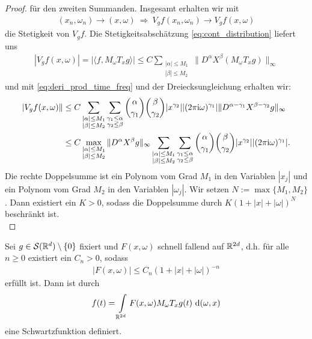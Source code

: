 \begin{proof}
	für den zweiten Summanden.
	Insgesamt erhalten wir mit
	\begin{align*}
	(x_n,\omega_n) \to (x,\omega) \ 
	\Rightarrow 
	\
	V_g f(x_n, \omega_n) \to V_g f (x, \omega)
	\end{align*}
	die Stetigkeit von $ V_g f $.
	Die Stetigkeitsabschätzung \eqref{eq:cont_distribution} liefert uns
	\begin{align*}
	| V_g f(x,\omega) |
	=
	|\langle f, M_\omega T_x g \rangle |
	\leq
	C
	\sum \limits_{\substack{|\alpha| \leq M_1\\
		|\beta| \leq M_2}
		}
	\| D^\alpha X^\beta (M_\omega T_x g)\|_\infty
	\end{align*}
	und mit \eqref{eq:deri_prod_time_freq} und der Dreiecksungleichung erhalten wir:
	\begin{align*}
	|V_g f(x,\omega)\| 
	&\leq 
	C
	\sum \limits_{
		\substack{|\alpha| \leq M_1 \\ |\beta| \leq M_2}
		}
	\sum \limits_{
		\substack{\gamma_1 \leq \alpha\\ \gamma_2 \leq \beta}
		}
	\binom{\alpha}{\gamma_1} \binom{\beta}{\gamma_2}
	|x^{\gamma_2}| |(2\pi \textrm{i} \omega)^{\gamma_1} | 
	\| D^{\alpha-\gamma_1} X^{\beta - \gamma_2} g \|_\infty\\
	&\leq
	C
	\max \limits_{
		\substack{|\alpha| \leq M_1 \\ |\beta| \leq M_2}
		}
	\| D^\alpha X^\beta g \|_\infty
	\sum \limits_{
		\substack{|\alpha| \leq M_1 \\ |\beta| \leq M_2}
	}
	\sum \limits_{
		\substack{\gamma_1 \leq \alpha\\ \gamma_2 \leq \beta}
	}
	\binom{\alpha}{\gamma_1} \binom{\beta}{\gamma_2}
	|x^{\gamma_2}| |(2\pi \textrm{i} \omega)^{\gamma_1} |.
	\end{align*}
	Die rechte Doppelsumme ist ein Polynom vom Grad $ M_1 $ in den Variablen $ |x_j| $ und ein Polynom vom Grad $ M_2 $ in den Variablen $ |\omega_j| $.
	Wir setzen $ N := \max\{M_1,M_2\} $. Dann existiert ein $ K > 0 $, sodass
	die Doppelsumme durch $ K (1+ |x| + |\omega|)^N $ beschränkt ist.\\
	\qedhere
\end{proof}
\vspace{-2.9cm}
\begin{lem}\label{th:rapid_decay_implies_schwartz}
Sei $ g \in \mathcal{S}(\mathbb{R}^d) \setminus \{ 0\} $ fixiert und $ F(x, \omega) $ schnell fallend auf $ \mathbb{R}^{2d} $, d.h. für alle $ n \geq 0 $ existiert ein $ C_n > 0 $, sodass 
\begin{align}\label{eq:rapid_decay}
| F(x,\omega) |\leq C_n (1 + |x| + |\omega|)^{-n}
\end{align}
erfüllt ist. Dann ist durch
\begin{align}\label{eq:schwartz_func_rapid_decay}
f(t) = \int \limits_{\mathbb{R}^{2d}} F(x, \omega) M_\omega T_x g(t) \text{ d} (\omega,x)
\end{align}
eine Schwartzfunktion definiert.
\end{lem}

